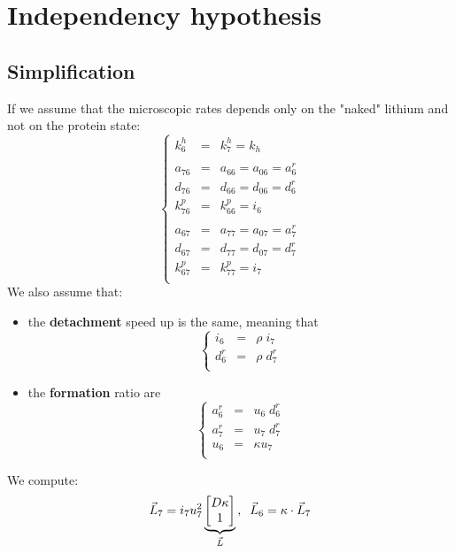 \documentclass[aps,onecolumn,11pt]{revtex4}
\begin{document}
\section{Independency hypothesis}
\subsection{Simplification}

If we assume that the microscopic rates depends only on the "naked" lithium and not on the protein state:
\begin{equation}
\label{eq:indep}
\left\lbrace
\begin{array}{rcl}
k^h_6    & = & k^h_7 = k_h\\
\\
a_{76}   & = & a_{66} = a_{06} = a^r_6\\
d_{76}   & = & d_{66} = d_{06} = d^r_6\\
k^p_{76} & = & k^p_{66} = i_6\\
\\
a_{67}   & = & a_{77} = a_{07} = a^r_7 \\
d_{67}   & = & d_{77} = d_{07} = d^r_7\\
k^p_{67} & = & k^p_{77} = i_7\\
\end{array}
\right.
\end{equation}
We also assume that:
\begin{itemize}
\item the {\bf detachment} speed up is the same, meaning that
\begin{equation}
\left\lbrace
\begin{array}{rcl}
	i_6 & = & \rho \; i_7\\
	d^r_6 & = & \rho \; d^r_7\\
\end{array}
\right.
\end{equation}
\item the {\bf formation} ratio are
\begin{equation}
\left\lbrace
\begin{array}{rcl}
	a^r_6 & = & u_6 \; d^r_6\\
	a^r_7 & = & u_7 \; d^r_7 \\
	u_6   & = & \kappa u_7 \\
\end{array}
\right.
\end{equation}
\end{itemize}
We compute:
\begin{equation}
	\vec{L}_7  = i_7 u_7^2 
	\underbrace{
	\begin{bmatrix}
	D\kappa\\
	1
	\end{bmatrix}
	}_{\vec{L}}
	\\,
	\;\;\vec{L}_6 = \kappa \cdot \vec{L}_7
\end{equation}
\end{document}
